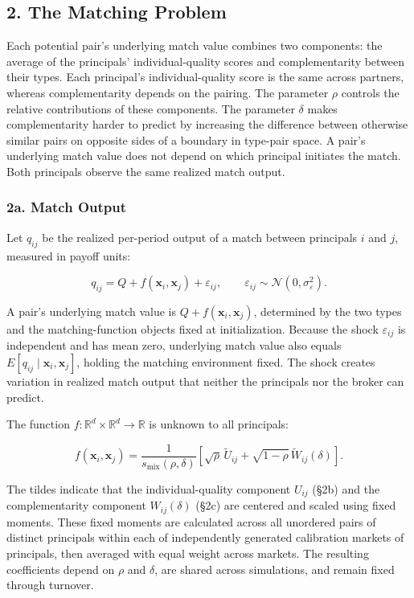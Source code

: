 \documentclass[11pt]{article}
\begin{document}
\subsection{2. The Matching Problem}\label{the-matching-problem}

Each potential pair's underlying match value combines two components: the average of the principals' individual-quality scores and complementarity between their types. Each principal's individual-quality score is the same across partners, whereas complementarity depends on the pairing. The parameter \(\rho\) controls the relative contributions of these components. The parameter \(\delta\) makes complementarity harder to predict by increasing the difference between otherwise similar pairs on opposite sides of a boundary in type-pair space. A pair's underlying match value does not depend on which principal initiates the match. Both principals observe the same realized match output.

\subsubsection{2a. Match Output}\label{a.-match-output}

Let \(q_{ij}\) be the realized per-period output of a match between principals \(i\) and \(j\), measured in payoff units:

\[q_{ij} = Q + f(\mathbf{x}_i, \mathbf{x}_j) + \varepsilon_{ij}, \qquad
\varepsilon_{ij} \sim \mathcal{N}(0, \sigma_\varepsilon^2).\]

A pair's underlying match value is \(Q+f(\mathbf{x}_i,\mathbf{x}_j)\), determined by the two types and the matching-function objects fixed at initialization. Because the shock \(\varepsilon_{ij}\) is independent and has mean zero, underlying match value also equals \(E[q_{ij}\mid\mathbf{x}_i,\mathbf{x}_j]\), holding the matching environment fixed. The shock creates variation in realized match output that neither the principals nor the broker can predict.

The function \(f: \mathbb{R}^d \times \mathbb{R}^d \to \mathbb{R}\) is unknown to all principals:

\[
f(\mathbf{x}_i,\mathbf{x}_j)
=\frac{1}{s_{\mathrm{mix}}(\rho,\delta)}
\left[\sqrt{\rho}\,\widetilde U_{ij}
+\sqrt{1-\rho}\,\widetilde W_{ij}(\delta)\right].
\]

The tildes indicate that the individual-quality component \(U_{ij}\) (§2b) and the complementarity component \(W_{ij}(\delta)\) (§2c) are centered and scaled using fixed moments. These fixed moments are calculated across all unordered pairs of distinct principals within each of  independently generated calibration markets of  principals, then averaged with equal weight across markets. The resulting coefficients depend on \(\rho\) and \(\delta\), are shared across simulations, and remain fixed through turnover.
\end{document}
